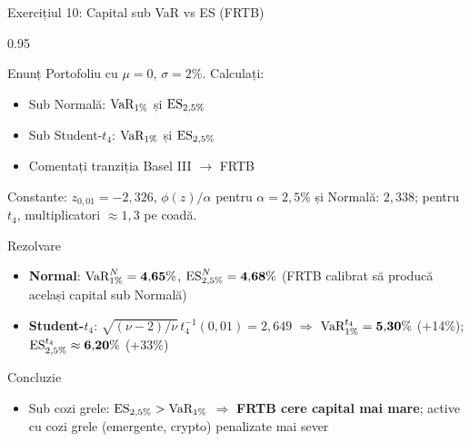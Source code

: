 \documentclass[9pt, aspectratio=169, t]{beamer}
\begin{document}
\begin{frame}[shrink=10]{Exercițiul 10: Capital sub VaR vs ES (FRTB)}
    \begin{cminipage}{0.95\textwidth}
    \begin{block}{Enunț}
    Portofoliu cu $\mu = 0$, $\sigma = 2\%$. Calculați:
    \begin{itemize}\setlength{\itemsep}{0pt}
        \item Sub Normală: $\text{VaR}_{1\%}$ și $\text{ES}_{2{,}5\%}$
        \item Sub Student-$t_4$: $\text{VaR}_{1\%}$ și $\text{ES}_{2{,}5\%}$
        \item Comentați tranziția Basel III $\to$ FRTB
    \end{itemize}
    Constante: $z_{0{,}01} = -2{,}326$, $\phi(z)/\alpha$ pentru $\alpha=2{,}5\%$ și Normală: $2{,}338$; pentru $t_4$, multiplicatori $\approx 1{,}3$ pe coadă.
    \end{block}
    \vspace{0.1cm}
    \begin{exampleblock}{Rezolvare}
    \begin{itemize}\setlength{\itemsep}{0pt}
        \item \textbf{Normal}: $\text{VaR}^{N}_{1\%} = \mathbf{4{,}65\%}$, $\text{ES}^{N}_{2{,}5\%} = \mathbf{4{,}68\%}$ (FRTB calibrat să producă același capital sub Normală)
        \item \textbf{Student-$t_4$}: $\sqrt{(\nu-2)/\nu}\,t_4^{-1}(0{,}01) = 2{,}649$ $\Rightarrow$ $\text{VaR}^{t_4}_{1\%} = \mathbf{5{,}30\%}$ (+14\%); $\text{ES}^{t_4}_{2{,}5\%} \approx \mathbf{6{,}20\%}$ (+33\%)
    \end{itemize}
    \end{exampleblock}
    \begin{alertblock}{Concluzie}
    \begin{itemize}\setlength{\itemsep}{0pt}
        \item Sub cozi grele: $\text{ES}_{2{,}5\%} > \text{VaR}_{1\%}$ $\Rightarrow$ \textbf{FRTB cere capital mai mare}; active cu cozi grele (emergente, crypto) penalizate mai sever
    \end{itemize}
    \end{alertblock}
    \end{cminipage}
\end{frame}
\end{document}
